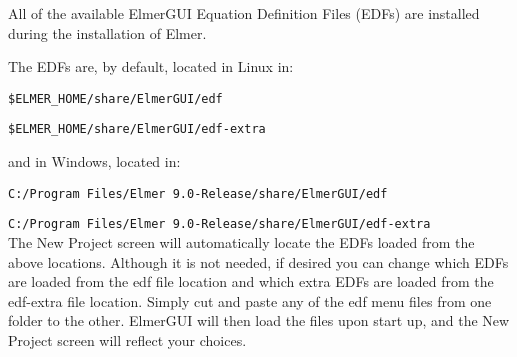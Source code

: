 All of the available ElmerGUI Equation Definition Files (EDFs) are installed during the installation of Elmer.

\noindent The EDFs are, by default, located in Linux in:

\texttt{\$ELMER\_HOME/share/ElmerGUI/edf}

\texttt{\$ELMER\_HOME/share/ElmerGUI/edf-extra}

\noindent and in Windows, located in:

\texttt{C:/Program Files/Elmer 9.0-Release/share/ElmerGUI/edf}

\texttt{C:/Program Files/Elmer 9.0-Release/share/ElmerGUI/edf-extra}\\

The New Project screen will automatically locate the EDFs loaded from the above locations.  Although it is not needed, if desired you can change which EDFs are loaded from the edf file location and which extra EDFs are loaded from the edf-extra file location.  Simply cut and paste any of the edf menu files from one folder to the other.   ElmerGUI will then load the files upon start up, and the New Project screen will reflect your choices.


